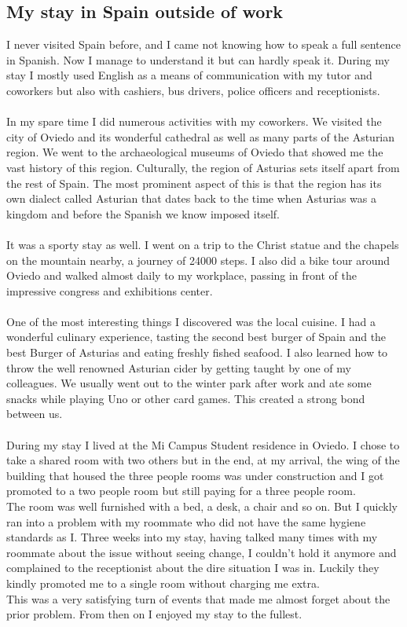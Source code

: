 \documentclass{article}
\begin{document}
\subsection{My stay in Spain outside of work}
I never visited Spain before, and I came not knowing how to speak a full sentence in Spanish. Now I manage to understand it but can hardly speak it.
During my stay I mostly used English as a means of communication with my tutor and coworkers but also with cashiers, bus drivers, police officers and receptionists.
\\\\
In my spare time I did numerous activities with my coworkers.
We visited the city of Oviedo and its wonderful cathedral as well as many parts of the Asturian region.
We went to the archaeological museums of Oviedo that showed me the vast history of this region.
Culturally, the region of Asturias sets itself apart from the rest of Spain. The most prominent aspect of this is that the region has its own dialect called Asturian that dates back to the time when Asturias was a kingdom and before the Spanish we know imposed itself.
\\\\
It was a sporty stay as well.
I went on a trip to the Christ statue and the chapels on the mountain nearby, a journey of 24000 steps.
I also did a bike tour around Oviedo and walked almost daily to my workplace, passing in front of the impressive congress and exhibitions center.
\\\\
One of the most interesting things I discovered was the local cuisine. I had a wonderful culinary experience, tasting the second best burger of Spain and the best Burger of Asturias and eating freshly fished seafood.
I also learned how to throw the well renowned Asturian cider by getting taught by one of my colleagues.
We usually went out to the winter park after work and ate some snacks while playing Uno or other card games. This created a strong bond between us.
\\\\
During my stay I lived at the Mi Campus Student residence in Oviedo.
I chose to take a shared room with two others but in the end, at my arrival, the wing of the building that housed the three people rooms was under construction and I got promoted to a two people room but still paying for a three people room.
\\
The room was well furnished with a bed, a desk, a chair and so on. But I quickly ran into a problem with my roommate who did not have the same hygiene standards as I. Three weeks into my stay, having talked many times with my roommate about the issue without seeing change, I couldn't hold it anymore and complained to the receptionist about the dire situation I was in. Luckily they kindly promoted me to a single room without charging me extra.
\\
This was a very satisfying turn of events that made me almost forget about the prior problem. From then on I enjoyed my stay to the fullest.
\end{document}
